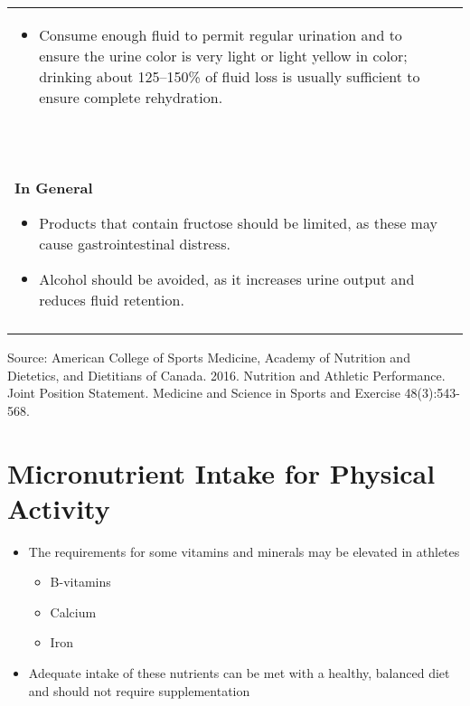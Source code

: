 \documentclass[title={Chapter 11}]{fdsn201notes}
\begin{document}
\begin{table}[H]
\begin{threeparttable}
\begin{tabular}{p{}p{}p{}}
{\begin{itemize}
					\item Consume enough fluid to permit regular urination and to ensure the urine color is very light or light yellow in color; drinking about 125--150\% of fluid loss is usually sufficient to ensure complete rehydration.
				\end{itemize}}~\\
			\multicolumn{3}{p{\textwidth}}{\textbf{In General}
				\begin{itemize}
					\item Products that contain fructose should be limited, as these may cause gastrointestinal distress.
					\item Alcohol should be avoided, as it increases urine output and reduces fluid retention.
				\end{itemize}}~\\
			\rowcolor{rowdarkgreen} & &
		\end{tabular}
		\begin{tablenotes}
			\small
			\item Source: American College of Sports Medicine, Academy of Nutrition and Dietetics, and Dietitians of Canada. 2016. Nutrition and Athletic Performance. Joint Position Statement. Medicine and Science in Sports and Exercise 48(3):543-568.
		\end{tablenotes}
	\end{threeparttable}
\end{table}

\section{Micronutrient Intake for Physical Activity}\label{sec:micronutrient-intake-for-physical-activity}
\begin{itemize}
	\item The requirements for some vitamins and minerals may be elevated in athletes
	\begin{itemize}
		\item B-vitamins
		\item Calcium
		\item Iron
	\end{itemize}
	\item Adequate intake of these nutrients can be met with a healthy, balanced diet and should not require supplementation
\end{itemize}
\end{document}
